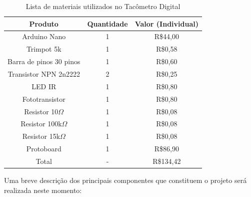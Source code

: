 \begin{table}[!h]
	\centering
	\label{tab:lista-materiais-tacometro}
	\begin{tabular}{ccc}
		\hline
		Produto & Quantidade & Valor (Individual) \\
		\hline
		Arduino Nano & 1 & R\$44,00 \\
	    Trimpot 5k\simbolo{$\Omega$}{Omega} & 1 & R\$0,58 \\
        Barra de pinos 30 pinos & 1 & R\$0,60 \\
        Transistor NPN 2n2222 & 2 & R\$0,25 \\
        LED IR & 1 & R\$0,80 \\
        Fototransistor & 1 & R\$0,80 \\
        Resistor 10{$\Omega$} & 1 & R\$0,08 \\
        Resistor 100k{$\Omega$} & 1 & R\$0,08 \\
        Resistor 15k{$\Omega$} & 1 & R\$0,08 \\
        Protoboard & 1 & R\$86,90 \\
        Total & - & R\$134,42 \\
		\hline
	\end{tabular}
    \caption[Lista de materiais utilizados no Tacômetro Digital]{Lista de materiais utilizados no Tacômetro Digital}
\end{table}

Uma breve descrição dos principais componentes que constituem o projeto será realizada neste momento:

